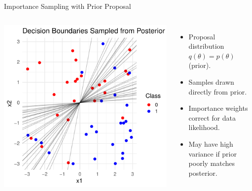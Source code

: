 \documentclass{beamer}
\begin{document}
\begin{frame}{Importance Sampling with Prior Proposal}
\begin{columns}
  \centering
  \includegraphics[width=\textwidth]{importance_sampling_from_prior.pdf}

  \small
  \begin{itemize}
    \item Proposal distribution \( q(\theta) = p(\theta) \) (prior).
    \item Samples drawn directly from prior.
    \item Importance weights correct for data likelihood.
    \item May have high variance if prior poorly matches posterior.
  \end{itemize}
\end{columns}
\end{frame}
\end{document}
